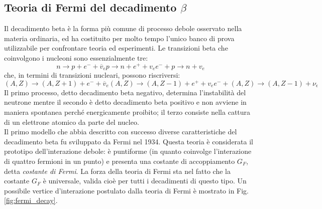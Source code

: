 \documentclass{subnucbo}
\begin{document}
\subsection{Teoria di Fermi del decadimento $\beta$}
Il decadimento beta è la forma più comune di processo debole osservato nella materia ordinaria, ed ha costituito per molto tempo l'unico banco di prova utilizzabile per confrontare teoria ed esperimenti. Le transizioni beta che coinvolgono i nucleoni sono essenzialmente tre:
\begin{subequations}
        \begin{equation}
                n \rightarrow p + e ^ { - } + \overline { v } _ { e }
                \label{eq:beta_neg}
        \end{equation}
        \begin{equation}
                p \rightarrow n + e ^ { + } + v _ { e }
                \label{eq:beta_pos}
        \end{equation}
        \begin{equation}
                e ^ { - } + p \rightarrow n + v _ { e }
                \label{eq:el_capture}
        \end{equation}
\end{subequations}
che, in termini di transizioni nucleari, possono riscriversi:
\begin{subequations}
        \begin{equation}
                ( A , Z ) \rightarrow ( A , Z + 1 ) + e ^ { - } + \overline { v } _ { e }
                \label{eq:beta_neg_trans}
        \end{equation}
        \begin{equation}
                ( A , Z ) \rightarrow ( A , Z - 1 ) + e ^ { + } + v _ { e }
                \label{eq:beta_pos_trans}
        \end{equation}
        \begin{equation}
                e ^ { - } + ( A , Z ) \rightarrow ( A , Z - 1 ) + \nu _ { \epsilon }
                \label{eq:el_capture_trans}
        \end{equation}
\end{subequations}
Il primo processo, detto decadimento beta negativo, determina l'instabilità del neutrone mentre il secondo è detto decadimento beta positivo e non avviene in maniera spontanea perché energicamente proibito; il terzo consiste nella cattura di un elettrone atomico da parte del nucleo. \\
Il primo modello che abbia descritto con successo diverse caratteristiche del decadimento beta fu sviluppato da Fermi nel 1934. Questa teoria è considerata il prototipo dell'interazione debole: è puntiforme (in quanto coinvolge l'interazione di quattro fermioni in un punto) e presenta una costante di accoppiamento $G_{F}$, detta \textit{costante di Fermi}. La forza della teoria di Fermi sta nel fatto che la costante $G_{F}$ è universale, valida cioè per tutti i decadimenti di questo tipo. Un possibile vertice d'interazione postulato dalla teoria di Fermi è mostrato in Fig. \ref{fig:fermi_decay}.\\
\end{document}
